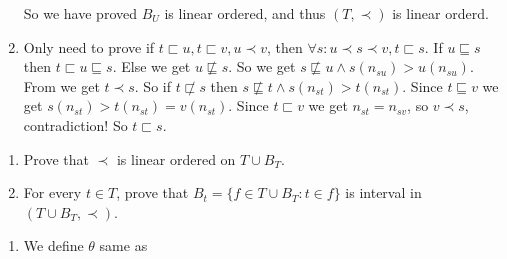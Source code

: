 \documentclass{ctexart}
\begin{document}
\begin{solution}
\begin{enumerate}
      So we have proved \(B_U\) is linear ordered, and thus \((T,\prec)\) is linear orderd. 
    \item Only need to prove if \(t \sqsubset u,t \sqsubset v,u \prec v\), then \(\forall s:u \prec s \prec v,t \sqsubset s\). 
      If \(u \sqsubseteq s\) then \(t \sqsubset u \sqsubseteq s\). 
      Else we get \(u \not \sqsubseteq s\). So we get \(s \not \sqsubseteq u \wedge s(n_{su})>u(n_{su})\). 
      From  we get \(t \prec s\). So if \(t \not \sqsubset s \) then \(s \not \sqsubseteq t \wedge s(n_{st})>t(n_{st})\). 
      Since \(t \sqsubseteq v\) we get \(s(n_{st})>t(n_{st})=v(n_{st})\). 
      Since \(t \sqsubset v\) we get \(n_{st}=n_{sv}\), so \(v \prec s\), contradiction! 
      So \(t \sqsubset s\). 
  \end{enumerate}
\end{solution}

\begin{problem}
  \begin{enumerate}
    \item Prove that \(\prec\) is linear ordered on \(T \cup B_T\). 
    \item For every \(t \in T\), prove that \(B_t = \{f \in T \cup B_T:t \in f\}\) is interval in \((T \cup B_T,\prec)\). 
  \end{enumerate}
\end{problem}

\begin{solution}
  \begin{enumerate}
    \item We define \(\theta\) same as 
  \end{enumerate}
\end{solution}
\end{document}

